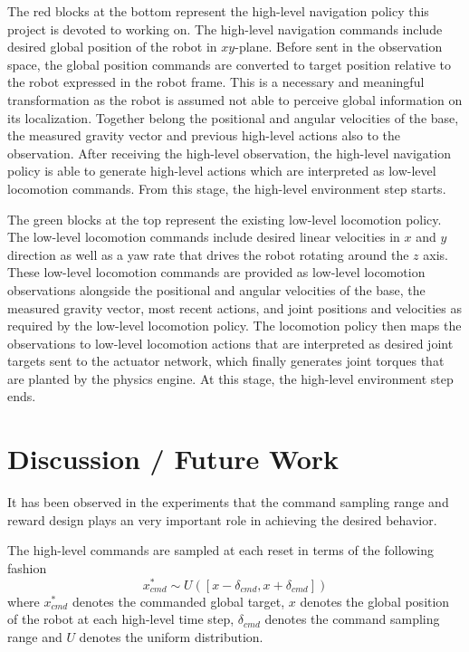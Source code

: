 \documentclass{article}
\begin{document}
The red blocks at the bottom represent the high-level navigation policy this project is devoted to working on. The high-level navigation commands include desired global position of the robot in $xy$-plane. Before sent in the observation space, the global position commands are converted to target position relative to the robot expressed in the robot frame. This is a necessary and meaningful transformation as the robot is assumed not able to perceive global information on its localization. Together belong the positional and angular velocities of the base, the measured gravity vector and previous high-level actions also to the observation. After receiving the high-level observation, the high-level navigation policy is able to generate high-level actions which are interpreted as low-level locomotion commands. From this stage, the high-level environment step starts.

The green blocks at the top represent the existing low-level locomotion policy. The low-level locomotion commands include desired linear velocities in $x$ and $y$ direction as well as a yaw rate that drives the robot rotating around the $z$ axis. These low-level locomotion commands are provided as low-level locomotion observations alongside the positional and angular velocities of the base, the measured gravity vector, most recent actions, and joint positions and velocities as required by the low-level locomotion policy. The locomotion policy then maps the observations to low-level locomotion actions that are interpreted as desired joint targets sent to the actuator network, which finally generates joint torques that are planted by the physics engine. At this stage, the high-level environment step ends.



\section{Discussion / Future Work}
It has been observed in the experiments that the command sampling range and reward design plays an very important role in achieving the desired behavior. 

The high-level commands are sampled at each reset in terms of the following fashion
\begin{equation}
    x_{cmd}^* \sim U([x - \delta_{cmd}, x + \delta_{cmd}])
\end{equation}
where $x_{cmd}^*$ denotes the commanded global target, $x$ denotes the global position of the robot at each high-level time step, $\delta_{cmd}$ denotes the command sampling range and $U$ denotes the uniform distribution.
\end{document}
